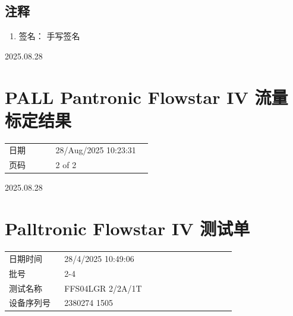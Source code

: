 \documentclass[UTF8,10pt,a4paper,fontset=fandol]{ctexart}
\newcommand{\fieldvalue}[1]{#1}
\newcommand{\handwritten}[1]{#1}
\begin{document}
\subsection*{注释}

\begin{enumerate}
\item 签名：%
\fieldvalue{\handwritten{手写签名}}
\end{enumerate}

\handwritten{2025.08.28}

\section*{PALL Pantronic Flowstar IV 流量标定结果}

\begin{tabular}{@{}p{0.30\linewidth}p{0.62\linewidth}@{}}
日期 &
\fieldvalue{28/Aug/2025 10:23:31}
\\
页码 &
\fieldvalue{2 of 2}
\end{tabular}

\vspace{1em}

\begin{center}
\end{center}

\handwritten{2025.08.28}

\newpage

\section{Palltronic Flowstar IV 测试单}

\begin{tabular}{@{}p{0.22\linewidth}p{0.68\linewidth}@{}}
日期时间 &
\fieldvalue{28/4/2025 10:49:06} \\
批号 &
\fieldvalue{2-4} \\
测试名称 &
\fieldvalue{FFS04LGR 2/2A/1T} \\
设备序列号 &
\fieldvalue{2380274 1505} \\
\end{tabular}
\end{document}
